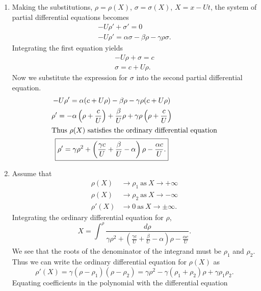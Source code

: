 \begin{Solution}
  \begin{enumerate}
  \item
    Making the substitutions, $\rho=\rho(X)$, $\sigma=\sigma(X)$, $X=x-Ut$, the
    system of partial differential equations becomes
    \begin{gather*}
      -U \rho' + \sigma' = 0 \\
      -U \rho' = \alpha \sigma - \beta \rho - \gamma \rho \sigma.
    \end{gather*}
    Integrating the first equation yields
    \begin{gather*}
      -U \rho + \sigma = c \\
      \sigma = c + U \rho.
    \end{gather*}
    Now we substitute the expression for $\sigma$ into the second partial 
    differential equation.
    \begin{gather*}
      -U \rho' = \alpha(c+U\rho) - \beta \rho - \gamma \rho(c+U\rho) \\
      \rho' = - \alpha\left(\rho+\frac{c}{U}\right) + \frac{\beta}{U}\rho
      + \gamma \rho\left(\rho+\frac{c}{U}\right) \\
      \intertext{Thus $\rho(X)$ satisfies the ordinary differential equation}
      \boxed{ \rho' = \gamma \rho^2 + \left(\frac{\gamma c}{U} + \frac{\beta}{U}
          -\alpha \right) \rho - \frac{\alpha c}{U}. }
    \end{gather*}
  \item
    Assume that
    \begin{align*}
      \rho(X) &\to \rho_1\ \mathrm{as}\ X \to +\infty \\
      \rho(X) &\to \rho_2\ \mathrm{as}\ X \to -\infty \\
      \rho'(X) &\to 0\ \mathrm{as}\ X \to \pm \infty.
    \end{align*}
    Integrating the ordinary differential equation for $\rho$,
    \[ X = \int^\rho \frac{d\rho}{\gamma \rho^2 + \left(\frac{\gamma c}{U} 
        + \frac{\beta}{U}-\alpha \right) \rho - \frac{\alpha c}{U}}. \]
    We see that the roots of the denominator of the integrand must be $\rho_1$
    and $\rho_2$.  Thus we can write the ordinary differential equation for 
    $\rho(X)$ as
    \[ \rho'(X) = \gamma(\rho-\rho_1)(\rho-\rho_2) = \gamma \rho^2
    - \gamma(\rho_1+\rho_2)\rho + \gamma \rho_1\rho_2. \]
    Equating coefficients in the polynomial with the differential equation 

\end{enumerate}
\end{Solution}
